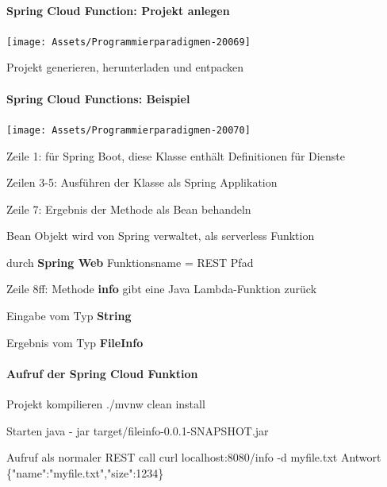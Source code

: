 \documentclass[10pt]{article}
\begin{document}
\paragraph{Spring Cloud Function: Projekt anlegen}

\begin{center}
  \centering
  \texttt{[image: Assets/Programmierparadigmen-20069]}
\end{center}
Projekt generieren, herunterladen und entpacken

\paragraph{Spring Cloud Functions: Beispiel}

\begin{center}
  \centering
  \texttt{[image: Assets/Programmierparadigmen-20070]}
\end{center}
\begin{itemize*}
  \item Zeile 1: für Spring Boot, diese Klasse enthält Definitionen für Dienste
  \item Zeilen 3-5: Ausführen der Klasse als Spring Applikation
  \item Zeile 7: Ergebnis der Methode als Bean behandeln
  \begin{itemize*}
    \item Bean Objekt wird von Spring verwaltet, als serverless Funktion
    \item durch \textbf{Spring Web} Funktionsname = REST Pfad
  \end{itemize*}
  \item Zeile 8ff: Methode \textbf{info} gibt eine Java Lambda-Funktion zurück
  \begin{itemize*}
    \item Eingabe vom Typ \textbf{String}
    \item Ergebnis vom Typ \textbf{FileInfo}
  \end{itemize*}
\end{itemize*}

\paragraph{Aufruf der Spring Cloud Funktion}

\begin{enumerate*}
  \item Projekt kompilieren \newline ./mvnw clean install
  \item Starten \newline
  java - jar target/fileinfo-0.0.1-SNAPSHOT.jar
  \item Aufruf als normaler REST call
  \newline curl localhost:8080/info -d myfile.txt
  \newline Antwort
  \newline \{"name":"myfile.txt","size":1234\}
\end{enumerate*}
\end{document}
